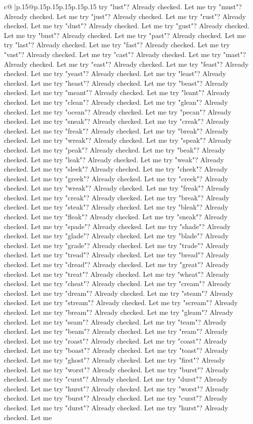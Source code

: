 \documentclass{article}
\begin{document}
{\begin{supertabular}{c@{$\;$}|p{.15\linewidth}@{}p{.15\linewidth}p{.15\linewidth}p{.15\linewidth}p{.15\linewidth}p{.15\linewidth}}
{{{try "lust"? Already checked. Let me try "must"? Already checked. Let me try "just"? Already checked. Let me try "rust"? Already checked. Let me try "dust"? Already checked. Let me try "gust"? Already checked. Let me try "bust"? Already checked. Let me try "past"? Already checked. Let me try "last"? Already checked. Let me try "fast"? Already checked. Let me try "vast"? Already checked. Let me try "cast"? Already checked. Let me try "mast"? Already checked. Let me try "east"? Already checked. Let me try "feast"? Already checked. Let me try "yeast"? Already checked. Let me try "least"? Already checked. Let me try "heast"? Already checked. Let me try "beast"? Already checked. Let me try "meant"? Already checked. Let me try "leant"? Already checked. Let me try "clean"? Already checked. Let me try "glean"? Already checked. Let me try "ocean"? Already checked. Let me try "pecan"? Already checked. Let me try "sneak"? Already checked. Let me try "creak"? Already checked. Let me try "freak"? Already checked. Let me try "break"? Already checked. Let me try "wreak"? Already checked. Let me try "speak"? Already checked. Let me try "peak"? Already checked. Let me try "beak"? Already checked. Let me try "leak"? Already checked. Let me try "weak"? Already checked. Let me try "sleek"? Already checked. Let me try "cheek"? Already checked. Let me try "greek"? Already checked. Let me try "creek"? Already checked. Let me try "wreak"? Already checked. Let me try "freak"? Already checked. Let me try "creak"? Already checked. Let me try "break"? Already checked. Let me try "steak"? Already checked. Let me try "bleak"? Already checked. Let me try "fleak"? Already checked. Let me try "sneak"? Already checked. Let me try "spade"? Already checked. Let me try "shade"? Already checked. Let me try "glade"? Already checked. Let me try "blade"? Already checked. Let me try "grade"? Already checked. Let me try "trade"? Already checked. Let me try "tread"? Already checked. Let me try "bread"? Already checked. Let me try "dread"? Already checked. Let me try "great"? Already checked. Let me try "treat"? Already checked. Let me try "wheat"? Already checked. Let me try "cheat"? Already checked. Let me try "cream"? Already checked. Let me try "dream"? Already checked. Let me try "steam"? Already checked. Let me try "stream"? Already checked. Let me try "scream"? Already checked. Let me try "bream"? Already checked. Let me try "gleam"? Already checked. Let me try "seam"? Already checked. Let me try "team"? Already checked. Let me try "beam"? Already checked. Let me try "ream"? Already checked. Let me try "roast"? Already checked. Let me try "coast"? Already checked. Let me try "boast"? Already checked. Let me try "toast"? Already checked. Let me try "ghost"? Already checked. Let me try "first"? Already checked. Let me try "worst"? Already checked. Let me try "burst"? Already checked. Let me try "curst"? Already checked. Let me try "durst"? Already checked. Let me try "hurst"? Already checked. Let me try "worst"? Already checked. Let me try "burst"? Already checked. Let me try "curst"? Already checked. Let me try "durst"? Already checked. Let me try "hurst"? Already checked. Let me }}}
\end{supertabular}}
\end{document}
